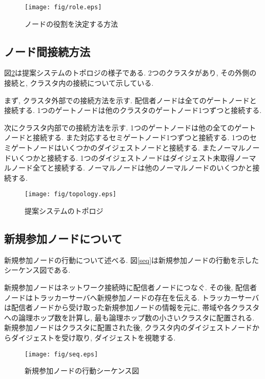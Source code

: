 \begin{figure}[h]
  \centering
  \texttt{[image: fig/role.eps]}
  \caption{ノードの役割を決定する方法}
  \label{fig:role}
\end{figure}

\newpage

\subsection{ノード間接続方法}
図\ref{fig:topology}は提案システムのトポロジの様子である. 2つのクラスタがあり, その外側の接続と, クラスタ内の接続について示している.

まず, クラスタ外部での接続方法を示す. 配信者ノードは全てのゲートノードと接続する. 1つのゲートノードは他のクラスタのゲートノード1つずつと接続する.

次にクラスタ内部での接続方法を示す. 1つのゲートノードは他の全てのゲートノードと接続する. また対応するセミゲートノード1つずつと接続する. 1つのセミゲートノードはいくつかのダイジェストノードと接続する. またノーマルノードいくつかと接続する. 1つのダイジェストノードはダイジェスト未取得ノーマルノード全てと接続する. ノーマルノードは他のノーマルノードのいくつかと接続する.

\begin{figure}[h]
  \centering
  \texttt{[image: fig/topology.eps]}
  \caption{提案システムのトポロジ}
  \label{fig:topology}
\end{figure}

\newpage

\subsection{新規参加ノードについて}
新規参加ノードの行動について述べる. 図\ref{seq}は新規参加ノードの行動を示したシーケンス図である.

新規参加ノードはネットワーク接続時に配信者ノードにつなぐ. その後, 配信者ノードはトラッカーサーバへ新規参加ノードの存在を伝える. トラッカーサーバは配信者ノードから受け取った新規参加ノードの情報を元に, 帯域や各クラスタへの論理ホップ数を計算し, 最も論理ホップ数の小さいクラスタに配置される. 新規参加ノードはクラスタに配置された後, クラスタ内のダイジェストノードからダイジェストを受け取り, ダイジェストを視聴する.

\begin{figure}[h]
  \centering
  \texttt{[image: fig/seq.eps]}
  \caption{新規参加ノードの行動シーケンス図}
  \label{fig:seq}
\end{figure}

